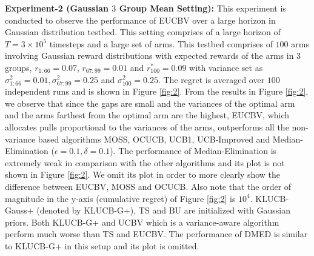 \textbf{Experiment-2 (Gaussian $3$ Group Mean Setting):} This experiment is conducted to observe the performance of EUCBV over a large horizon in Gaussian distribution testbed. This setting comprises of a large horizon of $T = 3\times 10^{5}$ timesteps and a large set of arms. This testbed comprises of $100$ arms involving Gaussian reward distributions with expected rewards of the arms in $3$ groups,  $r_{1:66}=0.07$, $r_{67:99}=0.01$ and $r^{*}_{100}=0.09$ with variance set as $\sigma_{1:66}^{2} = 0.01,\sigma_{67:99}^{2} = 0.25$ and $\sigma^{2}_{100}=0.25$. The regret is averaged over $100$ independent runs and is shown in Figure \ref{fig:2}. From the results in Figure \ref{fig:2}, we observe that since the gaps are small and the variances of the optimal arm and the arms farthest from the optimal arm are the highest, EUCBV, which allocates pulls proportional to the variances of the arms,  outperforms all the non-variance based algorithms MOSS, OCUCB, UCB1, UCB-Improved and Median-Elimination ($\epsilon=0.1,\delta=0.1$). The performance of Median-Elimination is extremely weak in comparison with the other algorithms and its plot is not shown in Figure \ref{fig:2}. We omit its plot in order to more clearly show the difference between EUCBV, MOSS and OCUCB. Also note that the order of magnitude in the y-axis (cumulative regret) of Figure \ref{fig:2} is $10^4$. KLUCB-Gauss+ (denoted by KLUCB-G+), TS and BU are initialized with Gaussian priors. Both KLUCB-G+ and UCBV which is a variance-aware algorithm perform much worse than TS and EUCBV. The performance of DMED is similar to KLUCB-G+ in this setup and its plot is omitted. 


